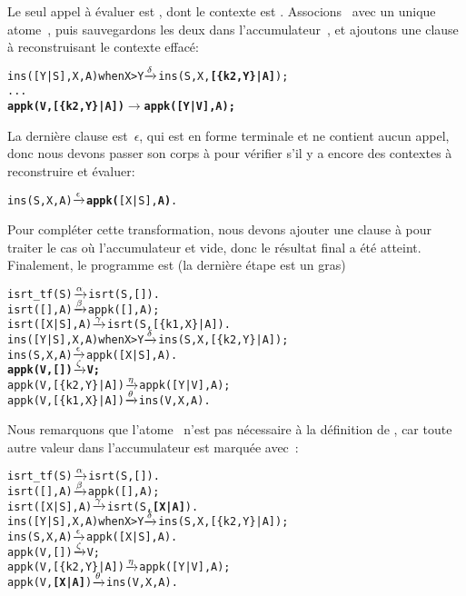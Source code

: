 Le seul appel à évaluer est , dont le contexte est
\erlcode{[Y|\textvisiblespace]}. Associons~ avec un unique
atome~, puis sauvegardons les deux dans
l'accumulateur~, et ajoutons une clause à
 reconstruisant le contexte effacé:
\begin{alltt}
ins([Y|S],X,A) when X > Y \(\smashedrightarrow{\delta}\) ins(S,X,\textbf{[\{k2,Y\}|A]});
...
\textbf{appk(V,[\{k2,Y\}|A])        \(\rightarrow\) appk([Y|V],A);}
\end{alltt}
La dernière clause est~\(\epsilon\), qui est en forme terminale et ne
contient aucun appel, donc nous devons passer son corps à
 pour vérifier s'il y a encore des contextes à
reconstruire et évaluer:
\begin{alltt}
ins(    S,X,A)            \(\smashedrightarrow{\epsilon}\) \textbf{appk(}[X|S],\textbf{A)}.
\end{alltt}
Pour compléter cette transformation, nous devons ajouter une clause à
 pour traiter le cas où l'accumulateur et vide, donc
le résultat final a été atteint. Finalement, le programme est (la
dernière étape est un gras)\label{isrt_tf_appk}
\begin{alltt}
isrt_tf(S)                \(\smashedrightarrow{\alpha}\) isrt(S,[]).
isrt(   [],A)             \(\smashedrightarrow{\beta}\) appk([],A);
isrt([X|S],A)             \(\smashedrightarrow{\gamma}\) isrt(S,[\{k1,X\}|A]).
ins([Y|S],X,A) when X > Y \(\smashedrightarrow{\delta}\) ins(S,X,[\{k2,Y\}|A]);
ins(    S,X,A)            \(\smashedrightarrow{\epsilon}\) appk([X|S],A).
\textbf{appk(V,        [])        \(\smashedrightarrow{\zeta}\) V;}
appk(V,[\{k2,Y\}|A])        \(\smashedrightarrow{\eta}\) appk([Y|V],A);
appk(V,[\{k1,X\}|A])        \(\smashedrightarrow{\theta}\) ins(V,X,A).
\end{alltt}
Nous remarquons que l'atome~ n'est pas nécessaire à la
définition de , car toute autre valeur dans
l'accumulateur est marquée avec~:
\begin{alltt}
isrt_tf(S)                \(\smashedrightarrow{\alpha}\) isrt(S,[]).
isrt(   [],A)             \(\smashedrightarrow{\beta}\) appk([],A);
isrt([X|S],A)             \(\smashedrightarrow{\gamma}\) isrt(S,\textbf{[X|A]}).\hfill% \emph{Ici}
ins([Y|S],X,A) when X > Y \(\smashedrightarrow{\delta}\) ins(S,X,[\{k2,Y\}|A]);
ins(    S,X,A)            \(\smashedrightarrow{\epsilon}\) appk([X|S],A).
appk(V,        [])        \(\smashedrightarrow{\zeta}\) V;
appk(V,[\{k2,Y\}|A])        \(\smashedrightarrow{\eta}\) appk([Y|V],A);
appk(V,     \textbf{[X|A]})        \(\smashedrightarrow{\theta}\) ins(V,X,A).\hfill% \emph{et là}
\end{alltt}
